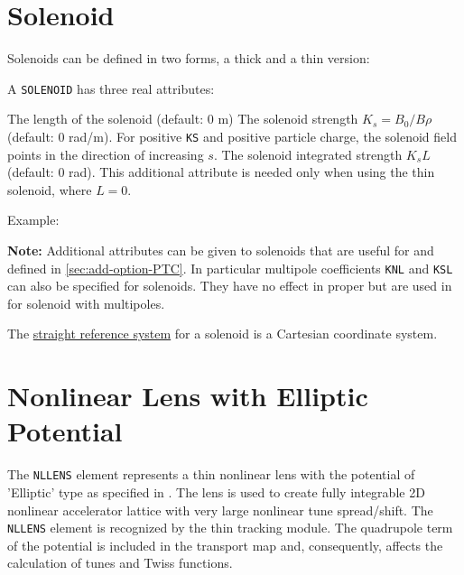 \section{Solenoid}
\label{sec:solenoid}

Solenoids can be defined in two forms, a thick and a thin version: 


A \texttt{SOLENOID} has three real attributes: 
\begin{madlist}
    The length of the solenoid (default: 0 m) 
    The solenoid strength $K_s = B_0 / B\rho$ (default: 0
     rad/m). For positive \texttt{KS} and positive particle charge, the
     solenoid field points in the direction of increasing $s$.  
    The solenoid integrated strength $K_s L$
     (default: 0 rad).  This additional attribute is needed only when
     using the thin solenoid,  where $L=0$.     
\end{madlist}

Example: 

\textbf{Note:} Additional attributes can be given to solenoids that
are useful for \ptc and defined in \ref{sec:add-option-PTC}.
In particular multipole coefficients \texttt{KNL} and \texttt{KSL} can
also be specified for solenoids. They have no effect in \madx proper but
are used in \ptc for solenoid with multipoles.

The \hyperref[subsec:local-straight]{straight reference system} for a
solenoid is a Cartesian coordinate system. 
 


\section{Nonlinear Lens with Elliptic Potential}
\label{sec:nllens}


The \texttt{NLLENS} element represents a thin nonlinear lens with the potential
of 'Elliptic' type as specified in \cite{danilov2010}. The lens is used
to create fully integrable 2D nonlinear accelerator lattice with very
large nonlinear tune spread/shift. The \texttt{NLLENS} element is recognized by
the thin tracking module. The quadrupole term of the potential is
included in the transport map and, consequently, affects the calculation
of tunes and Twiss functions.   

